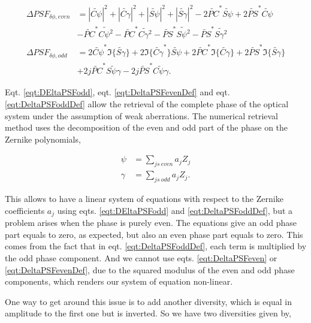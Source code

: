 \begin{align}
\Delta PSF_{\delta\phi, even} &= |\widetilde{C\psi}|^2 + |\widetilde{C\gamma}|^2 +|\widetilde{S\psi}|^2 + |\widetilde{S\gamma}|^2 -2\widetilde{PC}^*\widetilde{S\psi}+2\widetilde{PS}^*\widetilde{C\psi} \nonumber\\
&-\widetilde{PC}^*\widetilde{C\psi^2}-\widetilde{PC}^*\widetilde{C\gamma^2}-\widetilde{PS}^*\widetilde{S\psi^2}-\widetilde{PS}^*\widetilde{S\gamma^2} \label{eqt:DeltaPSFevenDef}\\
\Delta PSF_{\delta\phi, odd} &= 2\widetilde{C\psi}^*\Im\lbrace\widetilde{S\gamma}\rbrace+2\Im\lbrace\widetilde{C\gamma}^*\rbrace\widetilde{S\psi}+2\widetilde{PC}^*\Im\lbrace\widetilde{C\gamma}\rbrace+2\widetilde{PS}^*\Im\lbrace\widetilde{S\gamma}\rbrace \nonumber\\
&+2j\widetilde{PC}^*\widetilde{S\psi\gamma}-2j\widetilde{PS}^*\widetilde{C\psi\gamma}.\label{eqt:DeltaPSFoddDef}
\end{align}

Eqt. \eqref{eqt:DEltaPSFodd}, eqt. \eqref{eqt:DeltaPSFevenDef} and eqt. \eqref{eqt:DeltaPSFoddDef} allow the retrieval of the complete phase of the optical system under the assumption of weak aberrations. The numerical retrieval method uses the decomposition of the even and odd part of the phase on the Zernike polynomials,

\begin{align}
\psi &= \sum\limits_{js\ even} a_j Z_j \label{eqt:evenPhaseDecomp}\\
\gamma &= \sum\limits_{js\ odd} a_j Z_j. \label{eqt:oddPhaseDecomp}
\end{align}

This allows to have a linear system of equations with respect to the Zernike coefficients $a_j$ using eqts. \eqref{eqt:DEltaPSFodd} and \eqref{eqt:DeltaPSFoddDef}, but a problem arises when the phase is purely even. The equations give an odd phase part equals to zero, as expected, but also an even phase part equals to zero. This comes from the fact that in eqt. \eqref{eqt:DeltaPSFoddDef}, each term is multiplied by the odd phase component. And we cannot use eqts. \eqref{eqt:DeltaPSFeven} or \eqref{eqt:DeltaPSFevenDef}, due to the squared modulus of the even and odd phase components, which renders our system of equation non-linear.

One way to get around this issue is to add another diversity, which is equal in amplitude to the first one but is inverted. So we have two diversities given by,

